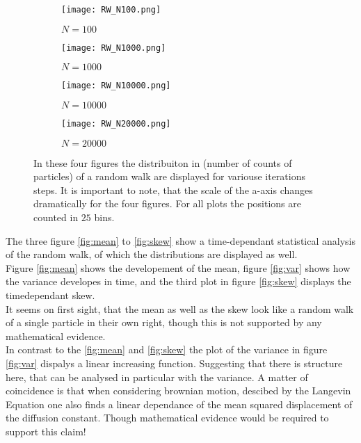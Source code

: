 \documentclass{article}[a4paper]
\begin{document}
\begin{figure}[h]
\centering
\begin{subfigure}{0.4\textwidth}
    \texttt{[image: RW\_N100.png]}
    \caption{$N=100$}
    \label{fig:first}
\end{subfigure}
\hfill
\begin{subfigure}{0.4\textwidth}
    \texttt{[image: RW\_N1000.png]}
    \caption{$N=1000$}
    \label{fig:second}
\end{subfigure}
\hfill
\begin{subfigure}{0.4\textwidth}
    \texttt{[image: RW\_N10000.png]}
    \caption{$N=10000$}
    \label{fig:third}
\end{subfigure}
\hfill
\begin{subfigure}{0.4\textwidth}
    \texttt{[image: RW\_N20000.png]}
    \caption{$N=20000$}
    \label{fig:fourth}
\end{subfigure}
\caption{In these four figures the distribuiton in (number of counts of particles) of a random walk are displayed for variouse iterations steps. It is important to note, that the scale of the a-axis changes dramatically for the four figures. For all plots the positions are counted in $25$ bins.}
\label{fig:probability_disti}
\end{figure}

The three figure \ref{fig:mean} to \ref{fig:skew} show a time-dependant statistical analysis of the random walk, of which the distributions are displayed as well.
\\ Figure \ref{fig:mean} shows the developement of the mean, figure \ref{fig:var} shows how the variance developes in time, and the third plot in figure \ref{fig:skew} displays the timedependant skew.\\
It seems on first sight, that the mean as well as the skew look like a random walk of a single particle in their own right, though this is not supported by any mathematical evidence.\\
In contrast to the \ref{fig:mean} and \ref{fig:skew} the plot of the variance in figure \ref{fig:var} dispalys a linear increasing function. Suggesting that there is structure here, that can be analysed in particular with the variance. A matter of coincidence is that when considering brownian motion, descibed by the Langevin Equation one also finds a linear dependance of the mean squared displacement of the diffusion constant. Though mathematical evidence would be required to support this claim!
\end{document}
